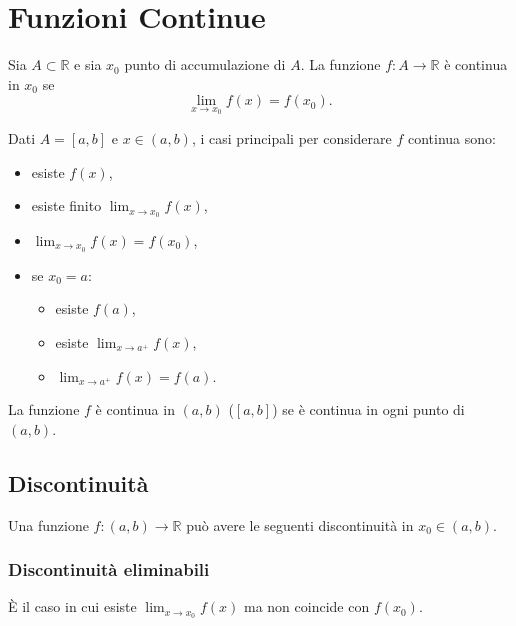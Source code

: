 \section{Funzioni Continue}

\begin{definition}
    Sia $A\subset\mathbb R$ e sia $x_0$ punto di accumulazione di $A$. La funzione $f\colon A\rightarrow\mathbb R$ è continua in $x_0$ se
    \begin{equation*}
        \lim_{x\rightarrow x_0}f(x)=f(x_0).
    \end{equation*}
\end{definition}

Dati $A=[a,b]$ e $x\in(a,b)$, i casi principali per considerare $f$ continua sono:
\begin{itemize}
    \item esiste $f(x)$,
    \item esiste finito $\lim_{x\rightarrow x_0}f(x)$,
    \item $\lim_{x\rightarrow x_0}f(x)=f(x_0)$,
    \item se $x_0=a$:
    \begin{itemize}
        \item esiste $f(a)$,
        \item esiste $\lim_{x\rightarrow a^+}f(x)$,
        \item $\lim_{x\rightarrow a^+}f(x)=f(a)$.
    \end{itemize}
\end{itemize}

\begin{definition}
    La funzione $f$ è continua in $(a,b)$ ($[a,b]$) se è continua in ogni punto di $(a,b)$.
\end{definition}

\subsection{Discontinuità}
Una funzione $f\colon(a,b)\rightarrow\mathbb R$ può avere le seguenti discontinuità in $x_0\in(a,b)$.

\subsubsection{Discontinuità eliminabili}
\begin{definition}
    È il caso in cui esiste $\lim_{x\rightarrow x_0}f(x)$ ma non coincide con $f(x_0)$.
\end{definition}

